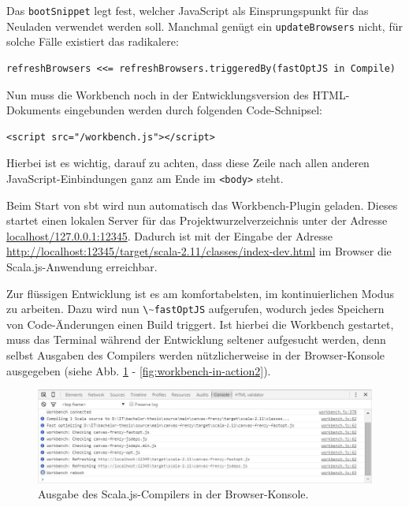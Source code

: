 \documentclass[a4paper, 12pt, hidelinks, listof=totoc, listoftables=totoc, bibliography=totoc]{scrreprt}
\newcommand{\code}[1]{\lstinline[language=Scala, style=inline]|#1|}
\newcommand{\html}[1]{\lstinline[language=HTML5, style=inline]|#1|}
\begin{document}
Das \code{bootSnippet} legt fest, welcher JavaScript als Einsprungspunkt für das Neuladen verwendet werden soll. Manchmal genügt ein \code{updateBrowsers} nicht, für solche Fälle existiert das radikalere:

\begin{lstlisting}[style=snippet]
refreshBrowsers <<= refreshBrowsers.triggeredBy(fastOptJS in Compile)
\end{lstlisting}

Nun muss die Workbench noch in der Entwicklungsversion des \ac{HTML}-Dokuments eingebunden werden durch folgenden Code-Schnipsel:

\begin{lstlisting}[language=HTML5, style=snippet]
<script src="/workbench.js"></script>
\end{lstlisting}

Hierbei ist es wichtig, darauf zu achten, dass diese Zeile nach allen anderen JavaScript-Einbindungen ganz am Ende im \html{<body>} steht.

Beim Start von sbt wird nun automatisch das Workbench-Plugin geladen. Dieses startet einen lokalen Server für das Projektwurzelverzeichnis unter der Adresse \url{localhost/127.0.0.1:12345}. Dadurch ist mit der Eingabe der Adresse \url{http://localhost:12345/target/scala-2.11/classes/index-dev.html} im Browser die Scala.js-Anwendung erreichbar.

Zur flüssigen Entwicklung ist es am komfortabelsten, im kontinuierlichen Modus zu arbeiten. Dazu wird nun \code{\~fastOptJS} aufgerufen, wodurch jedes Speichern von Code-Änderungen einen Build triggert. Ist hierbei die Workbench gestartet, muss das Terminal während der Entwicklung seltener aufgesucht werden, denn selbst Ausgaben des Compilers werden nützlicherweise in der Browser-Konsole ausgegeben (siehe Abb. \ref{fig:workbench-in-action1} - \ref{fig:workbench-in-action2}).

\begin{figure}[!h]
    \centering
    \includegraphics[width=1.0\textwidth]{workbench-in-action1}
    \caption{Ausgabe des Scala.js-Compilers in der Browser-Konsole.}
    \label{fig:workbench-in-action1}
\end{figure}
\end{document}
